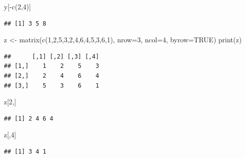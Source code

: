 \documentclass[]{article}
\newenvironment{Shaded}{\begin{snugshade}}{\end{snugshade}}
\newcommand{\AttributeTok}[1]{\textcolor[rgb]{0.77,0.63,0.00}{#1}}
\newcommand{\ConstantTok}[1]{\textcolor[rgb]{0.00,0.00,0.00}{#1}}
\newcommand{\DecValTok}[1]{\textcolor[rgb]{0.00,0.00,0.81}{#1}}
\newcommand{\FunctionTok}[1]{\textcolor[rgb]{0.00,0.00,0.00}{#1}}
\newcommand{\NormalTok}[1]{#1}
\newcommand{\OtherTok}[1]{\textcolor[rgb]{0.56,0.35,0.01}{#1}}
\newcommand{\SpecialCharTok}[1]{\textcolor[rgb]{0.00,0.00,0.00}{#1}}
\begin{document}
\begin{Shaded}
\begin{Highlighting}[]
\NormalTok{y[}\SpecialCharTok{{-}}\FunctionTok{c}\NormalTok{(}\DecValTok{2}\NormalTok{,}\DecValTok{4}\NormalTok{)]}
\end{Highlighting}
\end{Shaded}

\begin{verbatim}
## [1] 3 5 8
\end{verbatim}

\begin{Shaded}
\begin{Highlighting}[]
\NormalTok{z }\OtherTok{\textless{}{-}} \FunctionTok{matrix}\NormalTok{(}\FunctionTok{c}\NormalTok{(}\DecValTok{1}\NormalTok{,}\DecValTok{2}\NormalTok{,}\DecValTok{5}\NormalTok{,}\DecValTok{3}\NormalTok{,}\DecValTok{2}\NormalTok{,}\DecValTok{4}\NormalTok{,}\DecValTok{6}\NormalTok{,}\DecValTok{4}\NormalTok{,}\DecValTok{5}\NormalTok{,}\DecValTok{3}\NormalTok{,}\DecValTok{6}\NormalTok{,}\DecValTok{1}\NormalTok{), }\AttributeTok{nrow=}\DecValTok{3}\NormalTok{, }\AttributeTok{ncol=}\DecValTok{4}\NormalTok{, }\AttributeTok{byrow=}\ConstantTok{TRUE}\NormalTok{)}
\FunctionTok{print}\NormalTok{(z)}
\end{Highlighting}
\end{Shaded}

\begin{verbatim}
##      [,1] [,2] [,3] [,4]
## [1,]    1    2    5    3
## [2,]    2    4    6    4
## [3,]    5    3    6    1
\end{verbatim}

\begin{Shaded}
\begin{Highlighting}[]
\NormalTok{z[}\DecValTok{2}\NormalTok{,]}
\end{Highlighting}
\end{Shaded}

\begin{verbatim}
## [1] 2 4 6 4
\end{verbatim}

\begin{Shaded}
\begin{Highlighting}[]
\NormalTok{z[,}\DecValTok{4}\NormalTok{]}
\end{Highlighting}
\end{Shaded}

\begin{verbatim}
## [1] 3 4 1
\end{verbatim}
\end{document}
